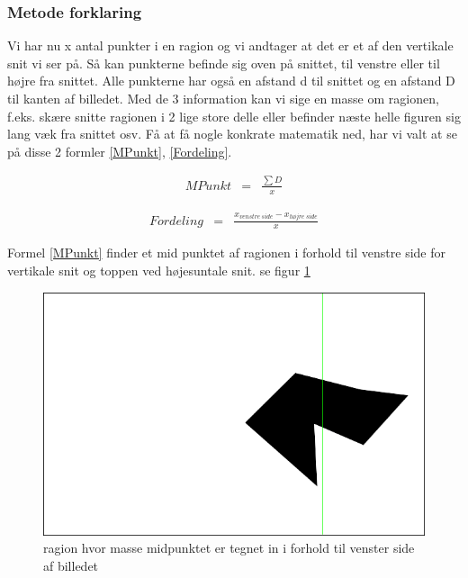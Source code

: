 {\subsubsection{Metode forklaring}
Vi har nu x antal punkter i en ragion og vi andtager at det er et af den
vertikale snit vi ser på. Så kan punkterne befinde sig oven på snittet,
til venstre eller til højre fra snittet. Alle punkterne har også en
afstand d til snittet og en afstand D til kanten af billedet. Med de 3
information kan vi sige en masse om ragionen, f.eks. skære snitte
ragionen i 2 lige store delle eller befinder næste helle figuren sig
lang væk fra snittet osv. Få at få nogle konkrate matematik ned, har vi
valt at se på disse 2 formler
\ref{MPunkt}, \ref{Fordeling}.

\begin{eqnarray} 
 MPunkt &=& \frac {\sum{D}}{x}\label{MPunkt}
\end{eqnarray}

\begin{eqnarray} 
 Fordeling &=& \frac{x_{venstre~side}-x_{højre~side}}{x}\label{Fordeling}
\end{eqnarray}

Formel \ref{MPunkt} finder et mid punktet af ragionen i forhold til
venstre side for vertikale snit og toppen ved højesuntale snit. se figur
\ref{midpunkt}

\begin{figure}[h]
	\begin{center}
		\includegraphics[scale=0.5,angle=0]{afsnit/vores_implementation/billeder/udvidet_loesning/centerOfmass.png}
	\end{center}
	\caption[]{ragion hvor masse midpunktet er tegnet in i forhold til venster side af billedet}
	\label{midpunkt}
\end{figure}

}
